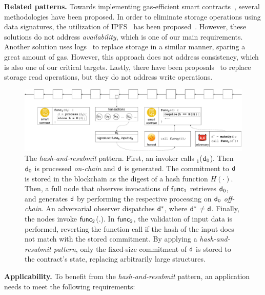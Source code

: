 \noindent \textbf{Related patterns.} Towards implementing gas-efficient smart
contracts~\cite{contract-opt-1,contract-opt-2,slither,madmax}, several
methodologies have been proposed. In order to eliminate storage operations
using data signatures, the utilization of IPFS~\cite{ipfs} has been
proposed~\cite{ipfs-1,ipfs-2}. However, these solutions do not address
\emph{availability}, which is one of our main requirements. Another solution
uses logs~\cite{logs} to replace storage in a similar manner, sparing a great
amount of gas. However, this approach does not address consistency, which is
also one of our critical targets. Lastly, there have been proposals~\cite{memory-array}
to replace storage read operations, but they do not address write operations.


\begin{figure}[h]
    \includegraphics[width=1\textwidth]{figures/har-pattern.pdf}

    \caption{The \emph{hash-and-resubmit} pattern. First, an invoker calls
        \proc$_1$($\mathsf{d}_0$). Then $\mathsf{d}_0$ is processed \emph{on-chain} and
        $\mathsf{d}$ is generated. The commitment to $\mathsf{d}$ is stored in the
        blockchain as the digest of a hash function $H(\cdot)$. Then,
        a full node that observes invocations of $\textsf{func}_1$ retrieves $\mathsf{d}_0$,
        and generates $\mathsf{d}$ by performing the respective processing on
        $\mathsf{d}_0$ \emph{off-chain}. An adversarial observer dispatches
        $\mathsf{d^*}$, where $\mathsf{d^*}$$\neq$$\mathsf{d}$. Finally, the nodes invoke
        $\textsf{func}_2$(.). In $\textsf{func}_2$, the validation of input data is performed,
        reverting the function call if the hash of the input does not
        match with the stored commitment. By applying
        a \emph{hash-and-resubmit pattern}, only the fixed-size commitment of
        $\mathsf{d}$ is stored to the contract's state, replacing arbitrarily large
        structures.}

        \label{fig:har-pattern}
\end{figure}

\noindent
\textbf{Applicability.}
To benefit from the \emph{hash-and-resubmit} pattern, an application needs to
meet the following requirements:

